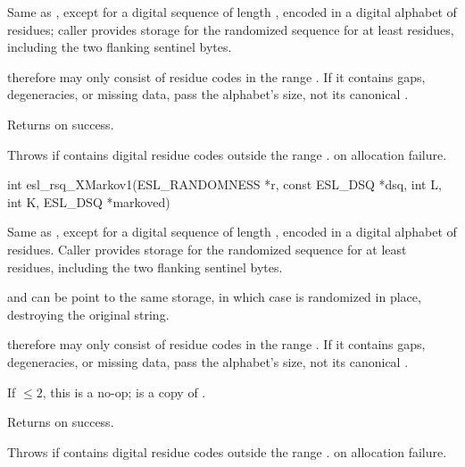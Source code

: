 \begin{sreapi}
Same as , except for a digital
sequence  of length , encoded in a digital 
alphabet of  residues; caller provides storage
for the randomized sequence  for at least 
  residues, including the two flanking
sentinel bytes.

 therefore may only consist of residue codes
in the range . If it contains gaps,
degeneracies, or missing data, pass the alphabet's
 size, not its canonical .

Returns  on success.

Throws  if  contains digital residue codes outside
the range .
 on allocation failure.


\hypertarget{func:esl_rsq_XMarkov1()}
{\item[int esl\_rsq\_XMarkov1(ESL\_RANDOMNESS *r, const ESL\_DSQ *dsq, int L, int K, ESL\_DSQ *markoved)]}

Same as , except for a digital
sequence  of length , encoded in a digital 
alphabet of  residues. Caller provides storage
for the randomized sequence  for at least 
  residues, including the two flanking
sentinel bytes.

 and  can be point to the same storage, in which
case  is randomized in place, destroying the original
string.

 therefore may only consist of residue codes
in the range . If it contains gaps,
degeneracies, or missing data, pass the alphabet's
 size, not its canonical .

If  $\leq 2$, this is a no-op;  is a copy of .

Returns  on success.

Throws  if  contains digital residue codes outside
the range .
 on allocation failure.


\end{sreapi}

